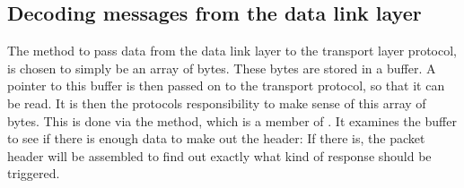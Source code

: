 \subsection{Decoding messages from the data link layer}
The method to pass data from the data link layer to the transport layer protocol, is chosen to simply be an array of bytes. These bytes are stored in a buffer. A pointer to this buffer is then passed on to the transport protocol, so that it can be read. It is then the protocols responsibility to make sense of this array of bytes. This is done via the  method, which is a member of . It examines the buffer to see if there is enough data to make out the header: If there is, the packet header will be assembled to find out exactly what kind of response should be triggered.

